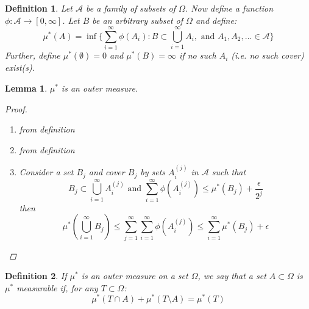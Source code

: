 \documentclass[12pt]{article}
\newtheorem{lemma}[theorem]{Lemma}
\newtheorem{definition}{Definition}
\begin{document}
\begin{definition}
	Let $\mathcal{A}$ be a family of subsets of $\Omega$. Now define a function $\phi : \mathcal{A} \to [0,\infty]$.  Let $B$ be an arbitrary subset of $\Omega$ and define:
	$$\mu^*(A) = \inf\{\sum_{i=1}^\infty \phi(A_i) : B \subset \bigcup_{i=1}^\infty A_i, \text{ and } A_1, A_2, ... \in \mathcal{A} \}$$
	Further, define $\mu^*(\emptyset) = 0$ and $\mu^*(B) = \infty$ if no such $A_i$ (i.e. no such cover) exist(s).
\end{definition}

\begin{lemma} \label{L:OuterMeasure}
	$\mu^*$ is an outer measure.
	\begin{proof} \quad
		\begin{enumerate}
		\item from definition
		\item from definition
		\item Consider a set $B_j$ and cover $B_j$ by sets $A_{i}^{(j)}$ in $\mathcal{A}$ such that $$B_j \subset \bigcup_{i=1}^\infty A_{i}^{(j)} \text{ and } \sum_{i=1}^\infty \phi (A_{i}^{(j)}) \le \mu^*(B_j) + \frac{\epsilon}{2^j}$$
		then
		$$\mu^*(\bigcup_{i=1}^\infty B_j) \le \sum_{j=1}^\infty \sum_{i=1}^\infty \phi(A_{i}^{(j)}) \le \sum_{i=1}^\infty \mu^*(B_j) + \epsilon$$
		\end{enumerate}
	\end{proof}
\end{lemma}

\begin{definition} \label{D:measurability}
	If $\mu^*$ is an outer measure on a set $\Omega$, we say that a set $A \subset \Omega$ is \emph{$\mu^*$ measurable} if, for any $T \subset \Omega$:
	$$\mu^*(T \cap A) + \mu^*(T \setminus A) = \mu^*(T)$$
\end{definition}
\end{document}
